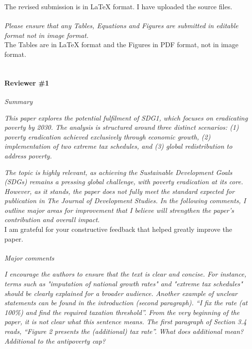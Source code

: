 \documentclass[12pt,english]{article}
\begin{document}
The revised submission is in LaTeX format. I have uploaded the source files.
~\\ ~\\

\textit{Please ensure that any Tables, Equations and Figures are submitted in editable format not in image format.}~\\

The Tables are in LaTeX format and the Figures in PDF format, not in image format.
~\\ ~\\


\paragraph*{Reviewer \#1}

\textit{Summary}

\textit{This paper explores the potential fulfilment of SDG1, which focuses on eradicating poverty by 2030. The analysis is structured around three distinct scenarios: (1) poverty eradication achieved exclusively through economic growth, (2) implementation of two extreme tax schedules, and (3) global redistribution to address poverty. }

\textit{The topic is highly relevant, as achieving the Sustainable Development Goals (SDGs) remains a pressing global challenge, with poverty eradication at its core. However, as it stands, the paper does not fully meet the standard expected for publication in The Journal of Development Studies. In the following comments, I outline major areas for improvement that I believe will strengthen the paper's contribution and overall impact.}~\\

I am grateful for your constructive feedback that helped greatly improve the paper. 
~\\ ~\\ 

\textit{Major comments}

\textit{I encourage the authors to ensure that the text is clear and concise. For instance, terms such as "imputation of national growth rates" and "extreme tax schedules" should be clearly explained for a broader audience. Another example of unclear statements can be found in the introduction (second paragraph). “I fix the rate (at 100\%) and find the required taxation threshold”. From the very beginning of the paper, it is not clear what this sentence means. The first paragraph of Section 3.4 reads, “Figure 2 presents the (additional) tax rate”. What does additional mean? Additional to the antipoverty cap? }~\\
\end{document}
